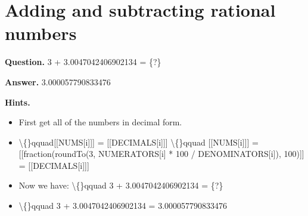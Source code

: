 \documentclass{article}
\begin{document}
\section*{Adding and subtracting rational numbers}
\textbf{Question.} 3 + 3.0047042406902134  = \{?\}

\textbf{Answer.} 3.000057790833476

\textbf{Hints.}
\begin{itemize}
  \item First get all of the numbers in decimal form.
  \item \textbackslash\{\}qquad[[NUMS[i]]] = [[DECIMALS[i]]]
                        \textbackslash\{\}qquad
                            [[NUMS[i]]] = [[fraction(roundTo(3, NUMERATORS[i] * 100 / DENOMINATORS[i]), 100)]] = [[DECIMALS[i]]]
  \item Now we have:
                        \textbackslash\{\}qquad
                            3 + 3.0047042406902134  = \{?\}
  \item \textbackslash\{\}qquad
                        3 + 3.0047042406902134  = 3.000057790833476
\end{itemize}
\end{document}
